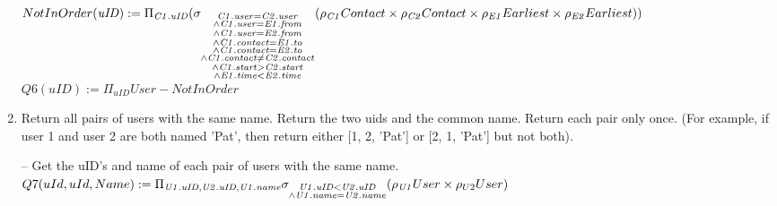 \documentclass{article}
\newcommand{\var}[1]{\mathit{#1}}
\begin{document}
\begin{enumerate}
{$
NotInOrder(\var{uID}) := \\ [5pt]
	\Pi_{\var{C1.uID}}
	(\sigma_{\substack{\var{C1.user} = \var{C2.user} \\
		\wedge \var{C1.user} = \var{E1.from} \\
		\wedge \var{C1.user} = \var{E2.from} \\
		\wedge \var{C1.contact} = \var{E1.to} \\
		\wedge \var{C1.contact} = \var{E2.to} \\
		\wedge \var{C1.contact} \neq \var{C2.contact} \\
		\wedge \var{C1.start} > \var{C2.start} \\
		\wedge \var{E1.time} < \var{E2.time}}}
		(\rho_{\var{C1}} Contact \times \rho_{\var{C2}} Contact
		\times \rho_{\var{E1}} Earliest \times \rho_{\var{E2}} Earliest)) \\ [5pt]
$
$
Q6(uID) := 
	\Pi_{\var{uID}} User - NotInOrder
$
}
\item   %
Return all pairs of users with the same name. Return the two uids and the common name. Return
each pair only once. (For example, if user 1 and user 2 are both named 'Pat', then return either [1, 2,
'Pat'] or [2, 1, 'Pat'] but not both). \\ [5pt]
\large{
\hspace*{1cm} -- Get the uID's and name of each pair of users with the same name. \\ [5 pt]
$
Q7(uId, uId, Name) := \Pi_{\var{U1.uID}, \var{U2.uID}, \var{U1.name}}
	 \sigma_{\substack{{\var{U1.uID}}  <  \var{U2.uID} \\
	  \wedge \var{U1.name} = \var{U2.name}}} (\rho_{\var{U1}} User \times \rho_{U2}User) \\ [5pt]
$

}
\end{enumerate}
\end{document}
